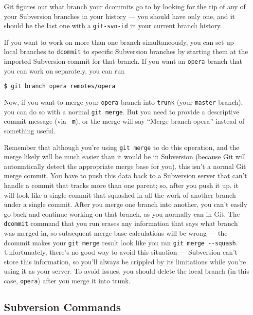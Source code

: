 \documentclass[a4paper]{book}
\begin{document}
Git figures out what branch your dcommits go to by looking for the tip of any of your Subversion branches in your history --- you should have only one, and it should be the last one with a \texttt{git-svn-id} in your current branch history.

If you want to work on more than one branch simultaneously, you can set up local branches to \texttt{dcommit} to specific Subversion branches by starting them at the imported Subversion commit for that branch. If you want an \texttt{opera} branch that you can work on separately, you can run

\begin{shaded}\begin{verbatim}
$ git branch opera remotes/opera
\end{verbatim}\end{shaded}

Now, if you want to merge your \texttt{opera} branch into \texttt{trunk} (your \texttt{master} branch), you can do so with a normal \texttt{git merge}. But you need to provide a descriptive commit message (via \texttt{-m}), or the merge will say “Merge branch opera” instead of something useful.

Remember that although you're using \texttt{git merge} to do this operation, and the merge likely will be much easier than it would be in Subversion (because Git will automatically detect the appropriate merge base for you), this isn't a normal Git merge commit. You have to push this data back to a Subversion server that can't handle a commit that tracks more than one parent; so, after you push it up, it will look like a single commit that squashed in all the work of another branch under a single commit. After you merge one branch into another, you can't easily go back and continue working on that branch, as you normally can in Git. The \texttt{dcommit} command that you run erases any information that says what branch was merged in, so subsequent merge-base calculations will be wrong --- the dcommit makes your \texttt{git merge} result look like you ran \texttt{git merge -{}-squash}. Unfortunately, there's no good way to avoid this situation --- Subversion can't store this information, so you'll always be crippled by its limitations while you're using it as your server. To avoid issues, you should delete the local branch (in this case, \texttt{opera}) after you merge it into trunk.

\subsection{Subversion Commands}
\end{document}
